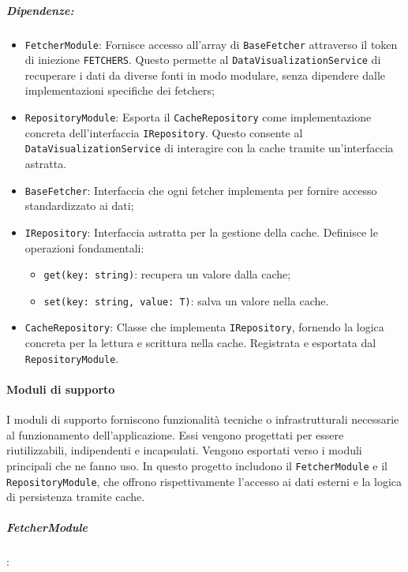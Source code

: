 \subparagraph{Dipendenze:}

\begin{itemize}
    \item \texttt{FetcherModule}: Fornisce accesso all'array di \texttt{BaseFetcher} attraverso il token di iniezione \texttt{FETCHERS}. Questo permette al \texttt{DataVisualizationService} di recuperare i dati da diverse fonti in modo modulare, senza dipendere dalle implementazioni specifiche dei fetchers;
    \item \texttt{RepositoryModule}: Esporta il \texttt{CacheRepository} come implementazione concreta dell'interfaccia \texttt{IRepository}. Questo consente al \texttt{DataVisualizationService} di interagire con la cache tramite un'interfaccia astratta.
    \item \texttt{BaseFetcher}: Interfaccia che ogni fetcher implementa per fornire accesso standardizzato ai dati;
    \item \texttt{IRepository}: Interfaccia astratta per la gestione della cache. Definisce le operazioni fondamentali:
    \begin{itemize}
        \item \texttt{get(key: string)}: recupera un valore dalla cache;
        \item \texttt{set(key: string, value: T)}: salva un valore nella cache.
    \end{itemize}
    \item \texttt{CacheRepository}: Classe che implementa \texttt{IRepository}, fornendo la logica concreta per la lettura e scrittura nella cache. Registrata e esportata dal \texttt{RepositoryModule}.
\end{itemize}


\paragraph{Moduli di supporto}
I moduli di supporto forniscono funzionalità tecniche o infrastrutturali necessarie al funzionamento dell’applicazione.
Essi vengono progettati per essere riutilizzabili, indipendenti e incapsulati. Vengono esportati verso i moduli principali che ne fanno uso.
In questo progetto includono il \texttt{FetcherModule} e il \texttt{RepositoryModule}, che offrono rispettivamente l'accesso ai dati esterni e la logica di persistenza tramite cache.


\subparagraph{FetcherModule}:

